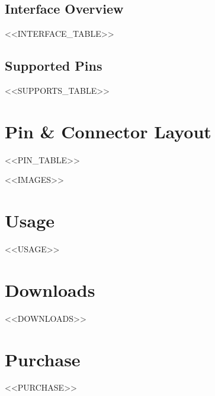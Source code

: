 \documentclass[10pt]{article}
\begin{document}
\subsection*{Interface Overview}
<<INTERFACE_TABLE>>

\subsection*{Supported Pins}
<<SUPPORTS_TABLE>>





\section*{Pin \& Connector Layout}
<<PIN_TABLE>>

\FloatBarrier
<<IMAGES>>


\section*{Usage}
<<USAGE>>

\section*{Downloads}

<<DOWNLOADS>>

\section*{Purchase}
<<PURCHASE>>
\end{document}
